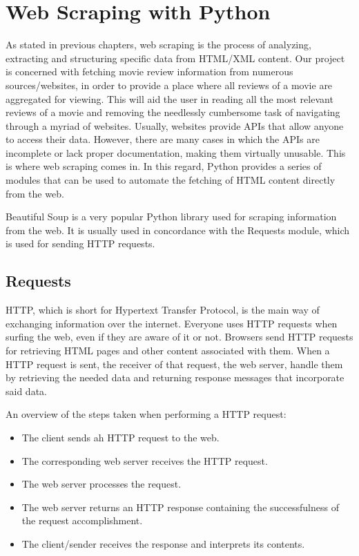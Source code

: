 \documentclass[12pt,a4paper,twoside]{report}
\begin{document}
\section{Web Scraping with Python}
As stated in previous chapters, web scraping is the process of analyzing, extracting and structuring specific data from HTML/XML content. Our project is concerned with fetching movie review information from numerous sources/websites, in order to provide a place where all reviews of a movie are aggregated for viewing. This will aid the user in reading all the most relevant reviews of a movie and removing the needlessly cumbersome task of navigating through a myriad of websites. Usually, websites provide APIs that allow anyone to access their data. However, there are many cases in which the APIs are incomplete or lack proper documentation, making them virtually unusable. This is where web scraping comes in. In this regard, Python provides a series of modules that can be used to automate the fetching of HTML content directly from the web.

Beautiful Soup is a very popular Python library used for scraping information from the web. It is usually used in concordance with the Requests module, which is used for sending HTTP requests. 

\subsection{Requests}
HTTP, which is short for Hypertext Transfer Protocol, is the main way of exchanging information over the internet. Everyone uses HTTP requests when surfing the web, even if they are aware of it or not. Browsers send HTTP requests for retrieving HTML pages and other content associated with them. When a HTTP request is sent, the receiver of that request, the web server, handle them by retrieving the needed data and returning response messages that incorporate said data.

\noindent An overview of the steps taken when performing a HTTP request:
\begin{itemize}
    \item The client sends ah HTTP request to the web.
    \item The corresponding web server receives the HTTP request.
    \item The web server processes the request.
    \item The web server returns an HTTP response containing the successfulness of the request accomplishment.
    \item The client/sender receives the response and interprets its contents.
\end{itemize}
\end{document}
